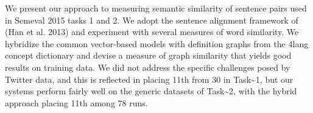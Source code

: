We present our approach to measuring semantic similarity of sentence pairs used in Semeval 2015 tasks 1 and 2. We adopt the sentence alignment framework of (Han et al. 2013) and experiment with several measures of word similarity. We hybridize the common vector-based models with definition graphs from the 4lang concept dictionary and devise a measure of graph similarity that yields good results on training data. We did not address the specific challenges posed by Twitter data, and this is reflected in placing 11th from 30 in Task{\textasciitilde}1, but our systems perform fairly well on the generic datasets of Task{\textasciitilde}2, with the hybrid approach placing 11th among 78 runs.
